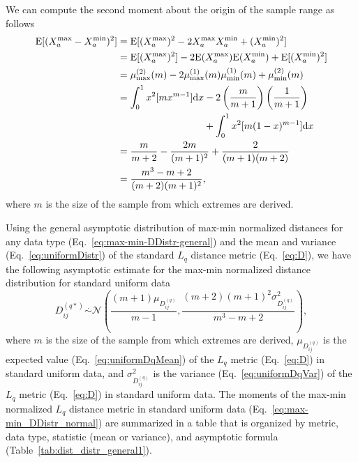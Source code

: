 \documentclass[aos]{imsart}
\begin{document}
We can compute the second moment about the origin of the sample range as follows
%
\begin{equation}\label{eq:mu2_rng_uniform}
\begin{aligned}
\text{E}[(X^\text{max}_a - X^\text{min}_a)^2] &= \text{E}[(X^\text{max}_a)^2 - 2 X^\text{max}_a X^\text{min}_a + (X^\text{min}_a)^2] \\
&= \text{E}[(X^\text{max}_a)^2] - 2 \text{E}(X^\text{max}_a) \text{E}(X^\text{min}_a) + \text{E}[(X^\text{min}_a)^2] \\
&= \mu^{(2)}_\text{max}(m) - 2 \mu^{(1)}_\text{max}(m) \mu^{(1)}_\text{min}(m) + \mu^{(2)}_\text{min}(m) \\
&= \int_{0}^{1} x^2 [m x^{m-1}] \text{d}x - 2 \left(\frac{m}{m+1}\right) \left(\frac{1}{m+1}\right) \\
& \hspace{3.12cm} + \int_{0}^{1} x^2 [m (1 - x)^{m-1}] \text{d}x \\
&= \frac{m}{m+2} - \frac{2m}{(m+1)^2} + \frac{2}{(m+1)(m+2)} \\
&= \frac{m^3 - m + 2}{(m+2)(m+1)^2},
\end{aligned}
\end{equation}
%
where $m$ is the size of the sample from which extremes are derived.

Using the general asymptotic distribution of max-min normalized distances for any data type (Eq.~\ref{eq:max-min-DDistr-general}) and the mean and variance (Eq.~\ref{eq:uniformDistr}) of the standard $L_q$ distance metric (Eq.~\ref{eq:D}), we have the following asymptotic estimate for the max-min normalized distance distribution for standard uniform data
%
\begin{equation}\label{eq:max-min_DDistr_uniform}
D^{(q*)}_{ij} \overset{.}{\sim} \mathcal{N}\left(\frac{(m+1)\mu_{D^{(q)}_{ij}}}{m-1}, \frac{(m+2)(m+1)^2 \sigma^2_{D^{(q)}_{ij}}}{m^3 - m + 2}\right),
\end{equation}
%
where $m$ is the size of the sample from which extremes are derived, $\mu_{D^{(q)}_{ij}}$ is the expected value (Eq.~\ref{eq:uniformDqMean}) of the $L_q$ metric (Eq.~\ref{eq:D}) in standard uniform data, and $\sigma^2_{D^{(q)}_{ij}}$ is the variance (Eq.~\ref{eq:uniformDqVar}) of the $L_q$ metric (Eq.~\ref{eq:D}) in standard uniform data. The moments of the max-min normalized $L_q$ distance metric in standard uniform data (Eq.~\ref{eq:max-min_DDistr_normal}) are summarized in a table that is organized by metric, data type, statistic (mean or variance), and asymptotic formula (Table~\ref{tab:dist_distr_general1}).
\end{document}
